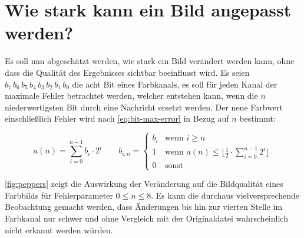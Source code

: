 \section{Wie stark kann ein Bild angepasst werden?} \label{sec:bild-these}
Es soll nun abgeschätzt werden, wie stark ein Bild verändert
werden kann, ohne dass die Qualität des Ergebnisses sichtbar beeinflusst
wird. Es seien $b_7\,b_6\,b_5\,b_4\,b_3\,b_2\,b_1\,b_0$ die acht Bit eines Farbkanals, es soll für
jeden Kanal der maximale Fehler betrachtet werden, welcher entstehen kann,
wenn die $n$ niederwertigsten Bit durch eine Nachricht ersetzt werden.
Der neue Farbwert einschließlich Fehler wird nach \eqref{eq:bit-max-error} in Bezug auf $n$ bestimmt:

\begin{equation}
  a(n) = \sum_{i=0}^{n - 1} b_i \cdot 2^i \qquad
  b_{i, n} =
  \begin{cases}
    b_i & \text{wenn $i \geq n$}                                                           \\
    1   & \text{wenn $a(n) \leq \lfloor \frac{1}{2} \cdot \sum_{i=0}^{n - 1} 2^i$} \rfloor \\
    0   & \text{sonst}
  \end{cases}
  \label{eq:bit-max-error}
\end{equation}

\noindent
\autoref{fig:peppers} zeigt die Auswirkung der Veränderung auf die Bildqualität
eines Farbbilds für Fehlerparameter $0 \leq n \leq 8$.
Es kann die durchaus vielversprechende Beobachtung
gemacht werden, dass Änderungen bis hin zur vierten Stelle im Farbkanal nur schwer und
ohne Vergleich mit der Originaldatei wahrscheinlich nicht erkannt werden würden.
\newpage

